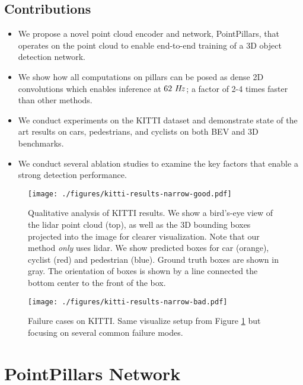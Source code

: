 \documentclass[10pt,twocolumn,letterpaper]{article}
\newcommand{\hertz}{$62~H\hspace{-.5mm}z$\xspace} \newcommand{\maxhertz}{$105~H\hspace{-.5mm}z$\xspace} \newcommand{\decorate}{9\xspace} \newcommand{\maxpillars}{12000\xspace} \newcommand{\maxpts}{100\xspace} \newcommand{\xyres}{0.16\xspace} \newcommand{\lidar}{lidar\xspace}
\newcommand{\figref}[1]{Figure \ref{#1}}
\newcommand{\squeeze}{\vspace{-0.5mm}}
\begin{document}
\subsection{Contributions}
\squeeze
\begin{itemize}
\setlength\itemsep{1mm}
\item We propose a novel point cloud encoder and network, PointPillars, that operates on the point cloud to enable end-to-end training of a 3D object detection network.
\item We show how all computations on pillars can be posed as dense 2D convolutions which enables inference at \hertz; a factor of 2-4 times faster than other methods.
\item We conduct experiments on the KITTI dataset and demonstrate state of the art results on cars, pedestrians, and cyclists on both BEV and 3D benchmarks.
\item We conduct several ablation studies to examine the key factors that enable a strong detection performance.
\end{itemize}
 


\begin{figure*}
\begin{center}
\texttt{[image: ./figures/kitti-results-narrow-good.pdf]}
\end{center}
\caption{Qualitative analysis of KITTI results.
We show a bird's-eye view of the lidar point cloud (top), as well as the 3D bounding boxes projected into the image for clearer visualization.
Note that our method \textit{only} uses lidar.
We show predicted boxes for car (orange), cyclist (red) and pedestrian (blue).
Ground truth boxes are shown in gray.
The orientation of boxes is shown by a line connected the bottom center to the front of the box.
}
\label{fig:kitti_visualize}
\end{figure*}

\begin{figure*}
\begin{center}
\texttt{[image: ./figures/kitti-results-narrow-bad.pdf]}
\end{center}
\caption{Failure cases on KITTI.
Same visualize setup from \figref{fig:kitti_visualize} but focusing on several common failure modes.
}
\label{fig:kitti_failure}
\end{figure*}

\section{PointPillars Network} \label{sec:network}
\squeeze
\end{document}

